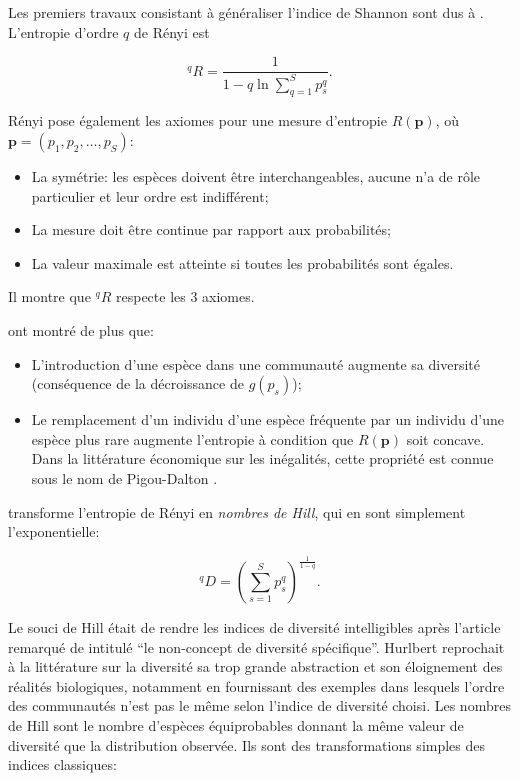 \documentclass[
  11pt,
  american,
  a4paper,
  extrafontsizes,onecolumn,openright
  ]{memoir}
\providecommand{\tightlist}{%
  \setlength{\itemsep}{0pt}\setlength{\parskip}{0pt}}
\begin{document}
Les premiers travaux consistant à généraliser l'indice de Shannon sont dus à \textcite{Renyi1961}.
L'entropie d'ordre \(q\) de Rényi est

\begin{equation}
^{q}\!R =\frac{1}{1 - q \ln\sum^S_{q=1}{p^q_s}}.
\end{equation}

Rényi pose également les axiomes pour une mesure d'entropie \(R(\mathbf{p})\), où \(\mathbf{p}=(p_1, p_2, \dots, p_S)\):

\begin{itemize}
\tightlist
\item
  La symétrie: les espèces doivent être interchangeables, aucune n'a de rôle particulier et leur ordre est indifférent;
\item
  La mesure doit être continue par rapport aux probabilités;
\item
  La valeur maximale est atteinte si toutes les probabilités sont égales.
\end{itemize}

Il montre que \(^{q}\!R\) respecte les 3 axiomes.

\textcite{Patil1982} ont montré de plus que:

\begin{itemize}
\tightlist
\item
  L'introduction d'une espèce dans une communauté augmente sa diversité (conséquence de la décroissance de \(g(p_s)\));
\item
  Le remplacement d'un individu d'une espèce fréquente par un individu d'une espèce plus rare augmente l'entropie à condition que \(R(\mathbf{p})\) soit concave.
  Dans la littérature économique sur les inégalités, cette propriété est connue sous le nom de Pigou-Dalton \autocite{Dalton1920}.
\end{itemize}

\textcite{Hill1973} transforme l'entropie de Rényi en \emph{nombres de Hill}, qui en sont simplement l'exponentielle:

\begin{equation}
  \label{eq:Hill1973}
  ^{q}\!D = {\left(\sum^S_{s=1}{p^q_s}\right)}^{\frac{1}{1 - q}}.
\end{equation}

Le souci de Hill était de rendre les indices de diversité intelligibles après l'article remarqué de \textcite{Hurlbert1971} intitulé \enquote{le non-concept de diversité spécifique}.
Hurlbert reprochait à la littérature sur la diversité sa trop grande abstraction et son éloignement des réalités biologiques, notamment en fournissant des exemples dans lesquels l'ordre des communautés n'est pas le même selon l'indice de diversité choisi.
Les nombres de Hill sont le nombre d'espèces équiprobables donnant la même valeur de diversité que la distribution observée.
Ils sont des transformations simples des indices classiques:
\end{document}
